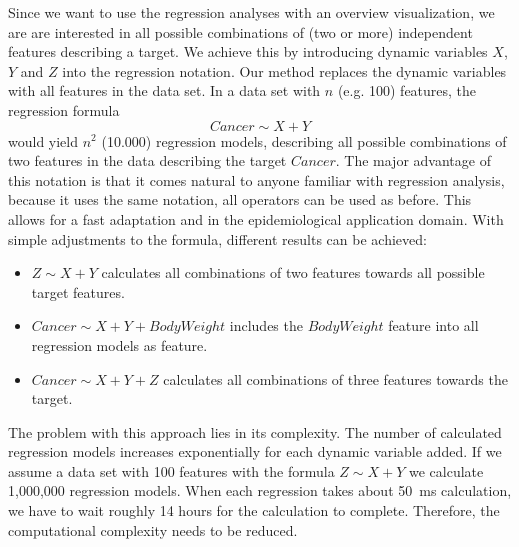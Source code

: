 \documentclass[journal]{style/vgtc} 			          %
\newcommand{\com}[1]{\textcolor{orange}{\uline{#1}}}
\begin{document}
Since we want to use the regression analyses with an overview visualization, we are are interested in all possible combinations of (two or more) independent features describing a target.
We achieve this by introducing dynamic variables $X$, $Y$ and $Z$ into the regression notation.
Our method replaces the dynamic variables with all features in the data set.
In a data set with $n$ (e.g. 100) features, the regression formula
\begin{equation}
Cancer \sim X + Y
\end{equation}
would yield $n^2$ (10.000) regression models, describing all possible combinations of two features in the data describing the target $Cancer$.
The major advantage of this notation is that it comes natural to anyone familiar with regression analysis, because it uses the same notation, all operators can be used as before.
This allows for a fast adaptation and in the epidemiological application domain.
With simple adjustments to the formula, different results can be achieved:
\begin{itemize}
	\item $Z \sim X + Y$ calculates all combinations of two features towards all possible target features.
	\item $Cancer \sim X + Y + BodyWeight$ includes the $BodyWeight$ feature into all regression models as feature.
	\item $Cancer \sim X + Y + Z$ calculates all combinations of three features towards the target.
\end{itemize}
The problem with this approach lies in its complexity.
The number of calculated regression models increases exponentially for each dynamic variable added.
If we assume a data set with 100 features with the formula $Z \sim X + Y$ we calculate 1,000,000 regression models.
When each regression takes about 50~ms calculation, we have to wait roughly 14 hours for the calculation to complete.
Therefore, the computational complexity needs to be reduced.
\end{document}
